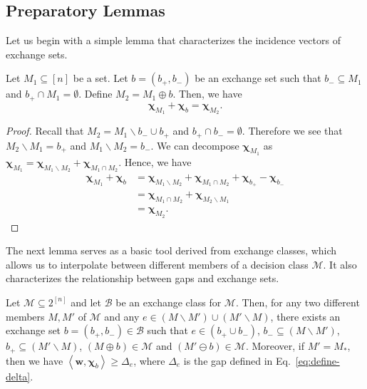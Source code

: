 \documentclass{article}
\newcommand{\M}{\mathcal M}
\newcommand{\B}{\mathcal B}
\newcommand{\del}{\backslash}
\DeclareMathOperator{\rad}{rad}
\newcommand{\inn}[1]{\left\langle #1 \right\rangle}
\renewcommand{\vec}[1]{\boldsymbol{#1}}
\begin{document}
\subsection{Preparatory Lemmas}
Let us begin with a simple lemma that characterizes the incidence vectors of exchange sets.
\begin{lemma}
Let $M_1 \subseteq [n]$ be a set.
Let $b=(b_+,b_-)$ be an exchange set such that 
$b_-\subseteq M_1$ and $b_+ \cap M_1 = \emptyset$.
Define $M_2 = M_1 \oplus b$.
Then, we have 
$$
\vec\chi_{M_1} +\vec\chi_{b} = \vec\chi_{M_2}.
$$
\label{lemma:exchange-char}
\end{lemma}

\begin{proof}
Recall that $M_2 = M_1 \del b_- \cup b_+$ and $b_+\cap b_-=\emptyset$.
Therefore we see that $M_2 \del M_1 = b_+$ and $M_1 \del M_2 = b_-$.
We can decompose $\vec\chi_{M_1}$ as $\vec\chi_{M_1}=\vec\chi_{M_1\del M_2}+\vec\chi_{M_1\cap M_2}$.
Hence, we have
\begin{align*}
   \vec\chi_{M_1}+\vec\chi_{b} &= \vec\chi_{M_1\del M_2}+\vec\chi_{M_1\cap M_2} + \vec\chi_{b_+}-\vec\chi_{b_-}\\
   							   &= \vec\chi_{M_1\cap M_2} + \vec\chi_{M_2\del M_1}\\
   							   &= \vec\chi_{M_2}.
\end{align*}
\end{proof}

The next lemma serves as a basic tool derived from exchange classes, which allows us to interpolate between different members of a decision class $\M$.
It also characterizes the relationship between gaps and exchange sets.
\begin{lemma}
\label{lemma:exchange}
Let $\M\subseteq 2^{[n]}$ and let $\B$ be an exchange class for $\M$.
Then, for any two different members $M,M'$ of $\M$ and any $e \in (M\del M')\cup(M'\del M)$, there exists an exchange set $b=(b_+,b_-) \in \B$ such that
$e\in (b_+\cup b_-)$, $b_-\subseteq (M\del M')$, $b_+\subseteq (M'\del M)$, 
$(M\oplus b) \in \M$ and  $(M'\ominus b) \in \M$.
Moreover, if $M' = M_*$, then we have $\inn{\vec w, \vec \chi_b} \ge \Delta_e$,
where $\Delta_e$ is the gap defined in Eq.~\eqref{eq:define-delta}.
\end{lemma}
\end{document}
